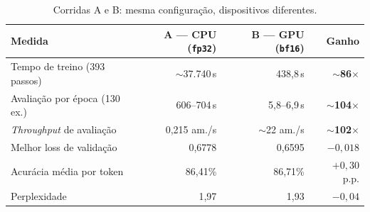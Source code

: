 \documentclass[12pt,a4paper]{article}
\begin{document}
\begin{table}[htbp]
\centering
\caption{Corridas A e B: mesma configuração, dispositivos diferentes.}
\label{tab:cpugpu}
\footnotesize
\begin{tabularx}{\textwidth}{L{6.0cm} r r r}
\toprule
\textbf{Medida} & \textbf{A --- CPU (\texttt{fp32})} & \textbf{B --- GPU (\texttt{bf16})} & \textbf{Ganho} \\
\midrule
Tempo de treino (393 passos)       & $\sim$37.740\,s & 438,8\,s & $\sim$\textbf{86$\times$}  \\
Avaliação por época (130 ex.)    & 606--704\,s     & 5,8--6,9\,s & $\sim$\textbf{104$\times$} \\
\emph{Throughput} de avaliação    & 0,215 am./s     & $\sim$22 am./s & $\sim$\textbf{102$\times$} \\
\midrule
Melhor loss de validação          & 0,6778          & 0,6595   & $-0{,}018$ \\
Acurácia média por token         & 86,41\%         & 86,71\%  & $+0{,}30$ p.p. \\
Perplexidade                       & 1,97            & 1,93     & $-0{,}04$ \\
\bottomrule
\end{tabularx}
\end{table}
\end{document}
